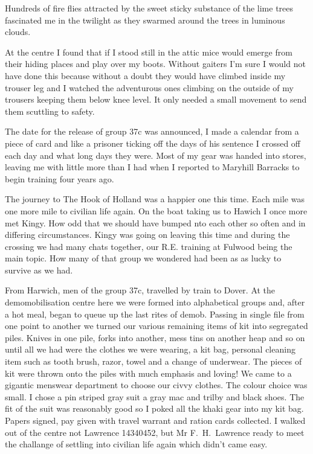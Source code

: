 Hundreds of fire flies attracted by the sweet sticky substance of the
lime trees fascinated me in the twilight as they swarmed around the
trees in luminous clouds.

At the centre I found that if I stood still in the attic mice would
emerge from their hiding places and play over my boots. Without
gaiters I'm sure I would not have done this because without a doubt
they would have climbed inside my trouser leg and I watched the
adventurous ones climbing on the outside of my trousers keeping them
below knee level. It only needed a small movement to send them
scuttling to safety.

The date for the release of group 37c was announced, I made a
calendar from a piece of card and like a prisoner ticking off the days
of his sentence I crossed off each day and what long days they
were. Most of my gear was handed into stores, leaving me with little
more than I had when I reported to Maryhill Barracks to begin training
four years ago.

The journey to The Hook of Holland was a happier one this time. Each
mile was one more mile to civilian life again. On the boat taking us
to Hawich I once more met Kingy. How odd that we should have bumped
nto each other so often and in differing circumstances. Kingy was
going on leaving this time and during the crossing we had many chats
together, our R.E. training at Fulwood being the main topic. How many
of that group we wondered had been as as lucky to survive as we had.
 
From Harwich, men of the group 37c, travelled by train to Dover. At
the demomobilisation centre here we were formed into alphabetical
groups and, after a hot meal, began to queue up the last rites of
demob. Passing in single file from one point to another we turned our
various remaining items of kit into segregated piles. Knives in one
pile, forks into another, mess tins on another heap and so on until
all we had were the clothes we were wearing, a kit bag, personal
cleaning item such as tooth brush, razor, towel and a change of
underwear. The pieces of kit were thrown onto the piles with much
emphasis and loving! We came to a gigantic menswear department to
choose our civvy clothes. The colour choice was small. I chose a pin
striped gray suit a gray mac and trilby and black shoes. The fit of
the suit was reasonably good so I poked all the khaki gear into my kit
bag. Papers signed, pay given with travel warrant and ration cards
collected. I walked out of the centre not Lawrence 14340452, but Mr
F.~H.~Lawrence ready to meet the challange of settling into civilian
life again which didn't came easy.

